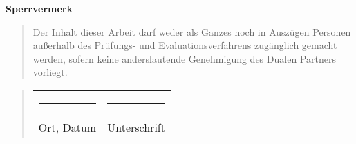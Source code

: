 \begin{titlepage}
	\begin{center}
		\vspace*{1cm}
		\Huge\bf Sperrvermerk\\
		\vspace*{2cm}
		\large\rm
		
		\begin{quotation}
			\hspace*{-1.75em}
			\parbox{0.85\textwidth}{\singlespacing Der Inhalt dieser Arbeit darf weder als Ganzes noch in Auszügen Personen außerhalb des 
Prüfungs- und Evaluationsverfahrens zugänglich gemacht werden, sofern keine 
anderslautende Genehmigung des Dualen Partners vorliegt.}
		\end{quotation}
		\vspace*{0.5cm}
		\begin{quotation}
			\hspace*{-1.5em}
			\parbox{\textwidth}{
				\singlespacing
				\begin{tabularx}{0.83\textwidth}{l@{\extracolsep\fill}l}
					\rule{4cm}{0.3mm}&\rule{4cm}{0.3mm}\\
					\large
					Ort, Datum&\large Unterschrift
				\end{tabularx}}
			\end{quotation}
		\end{center}
	\end{titlepage}
	\newpage
	\setcounter{page}{3}

